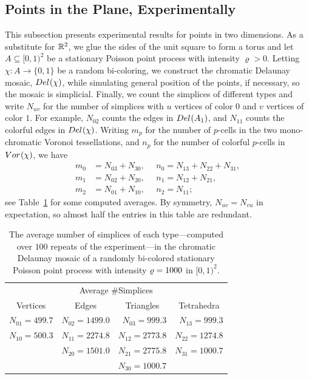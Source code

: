 \documentclass[a4paper]{article}
\newcommand {\mm}[1]   {\ifmmode{#1}\else{\mbox{\(#1\)}}\fi}
\newcommand{\Rspace}        {\mm{{\mathbb R}}}
\newcommand{\Voronoi}[2]    {\mm{{\rm Vor}_{#1}{({#2})}}}
\newcommand{\Delaunay}[2]   {\mm{{\rm Del}_{#1}{({#2})}}}
\newcommand{\intensity}     {\mm{\varrho}}
\theoremstyle{definition}
\numberwithin{theorem}{section}
\numberwithin{equation}{section}
\begin{document}
\subsection{Points in the Plane, Experimentally}
\label{sec:5.2}

This subsection presents experimental results for points in two dimensions.
As a substitute for $\Rspace^2$, we glue the sides of the unit square to form a torus and let $A \subseteq [0,1)^2$ be a stationary Poisson point process with intensity $\varrho > 0$.
Letting $\chi \colon A \to \{0,1\}$ be a random bi-coloring, we construct the chromatic Delaunay mosaic, $\Delaunay{}{\chi}$, while simulating general position of the points, if necessary, so the mosaic is simplicial.
Finally, we count the simplices of different types and write $N_{uv}$ for the number of simplices with $u$ vertices of color $0$ and $v$ vertices of color $1$.
For example, $N_{02}$ counts the edges in $\Delaunay{}{A_1}$, and $N_{11}$ counts the colorful edges in $\Delaunay{}{\chi}$.
Writing $m_p$ for the number of $p$-cells in the two mono-chromatic Voronoi tessellations, and $n_p$ for the number of colorful $p$-cells in $\Voronoi{}{\chi}$, we have
\begin{align}
  m_0  &=  N_{03} + N_{30} , ~~~~~~n_0  =  N_{13} + N_{22} + N_{31}, 
   \label{eqn:m0n0d2} \\
  m_1  &=  N_{02} + N_{20} , ~~~~~~n_1  =  N_{12} + N_{21}, 
    \label{eqn:m1n1d2} \\
  m_2  &=  N_{01} + N_{10} , ~~~~~~n_2  =  N_{11};
    \label{eqn:mpnp_d2_s1}
\end{align}
see Table~\ref{tbl:simplices_d2_s1} for some computed averages.
By symmetry, $N_{uv} = N_{vu}$ in expectation, so almost half the entries in this table are redundant.
\begin{table}[hbt]
    \centering
        \begin{tabular}{rrrr}
      \multicolumn{4}{c}{Average \#Simplices} \\
      \multicolumn{1}{c}{Vertices} & \multicolumn{1}{c}{Edges} & \multicolumn{1}{c}{Triangles} & \multicolumn{1}{c}{Tetrahedra} \\
      \hline
       $N_{01} = 499.7$ & $N_{02} = 1499.0$ & $N_{03} =  999.3$ & $N_{13} =  999.3$ \\
       $N_{10} = 500.3$ & $N_{11} = 2274.8$ & $N_{12} = 2773.8$ & $N_{22} = 1274.8$ \\
                         & $N_{20} = 1501.0$ & $N_{21} = 2775.8$ & $N_{31} =  1000.7$ \\
                         &                    & $N_{30} =  1000.7$ &    
    \end{tabular}
    \caption{The average number of simplices of each type---computed over $100$ repeats of the experiment---in the chromatic Delaunay mosaic of a randomly bi-colored stationary Poisson point process with intensity $\intensity = 1000$ in $[0,1)^2$.}
    \label{tbl:simplices_d2_s1}
\end{table}
\end{document}

